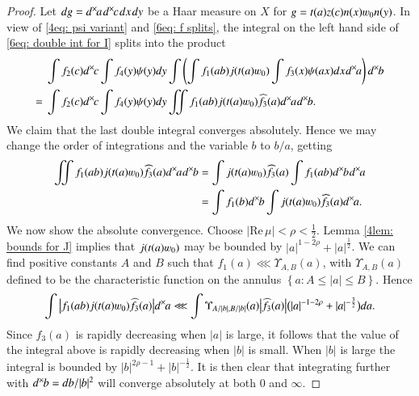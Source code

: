 \documentclass{amsproc}
\def\lp {\left (}
\def\rp {\right )}
\renewcommand{\Re}{{\mathrm{Re}\,}}
\def\shskip{\hskip 0.5 pt}
\def\dx{d^{\times} \hskip -1 pt}
\theoremstyle{plain}
\numberwithin{equation}{section}
\begin{document}
\begin{proof}
	Let $dg = \dx  a  \hskip 1 pt  \dx c \hskip 1 pt  d x \hskip 1 pt  d y$ be a Haar measure on $X$ for $g = t(a)  z(c) n(x) \varw_0 n(y)$. In view of \eqref{4eq: psi variant} and \eqref{6eq: f splits},
	the integral on the left hand side of \eqref{6eq: double int for I}   splits into the product
	\begin{align*}
	& \int  f_2 (c) \dx  c  \int   f_4 (y ) \psi (y) d y \int  \lp  \int  f_1 (ab) j  (t(a) \varw_0) \int f_3 (x) \psi (  a x) d x \shskip  \dx  a \rp \dx  b \\
	= \ & \int  f_2 (c) \dx  c  \int   f_4 (y ) \psi (y) d y \iint        f_1 (ab) j  (t(a) \varw_0) \widehat f_3 (a)    \dx  a \shskip   \dx  b.
	\end{align*}
	We claim that the last double integral converges absolutely. Hence we may change the order of integrations and the variable $b$ to $b/a$, getting
	\begin{align*}
	\iint        f_1 (ab) j  (t(a) \varw_0) \widehat f_3 (a)    \dx  a \shskip   \dx  b & = \int         j  (t(a) \varw_0) \widehat f_3 (a)  \int f_1 (ab) \dx  b \shskip   \dx  a \\
	& = \int f_1 (b  ) \dx  b \int    j  (t(a) \varw_0) \widehat f_3 (a)     \dx  a.
	\end{align*}
	We now show   the absolute  convergence. Choose $|\Re \mu | < \rho <  \frac 1 2$.  Lemma \ref{4lem: bounds for J} implies that $j  (t(a) \varw_0)$ may be bounded by $|a|^{1 - 2\rho} +   {|a|}^{\frac 1 2}$. We can find positive constants $A$ and $B$ such that $f_1 (a ) \lll \Upsilon_{A, B} (a)$, with $ \Upsilon_{A, B} (a)$ defined to be the characteristic function on the annulus $\left\{ a : A \leqslant |a| \leqslant B \right\}$. Hence
	\begin{align*}
	\int      \big|  f_1 (ab) j  (t(a) \varw_0) \widehat f_3(a)  \big|  \dx  a  \lll \int \Upsilon_{A/|b|, B/|b|} (a) \big|\widehat f_3 (a) \big| \big( |a|^{- 1- 2 \rho} + |a|^{- \frac 3 2} \big) d a.
	\end{align*}
	Since $\widehat f_3 (a)$ is rapidly decreasing when $|a|$ is large, it follows that the value of the integral above is rapidly decreasing when $|b|$ is small. When $|b|$ is large the integral is bounded by $  |b|^{2 \rho - 1} + |b|^{- \frac 1 2}$. It is then clear that integrating further with $\dx  b = d b / |b|^2$ will converge absolutely  at both $0$ and $\infty$.
\end{proof}
\end{document}
